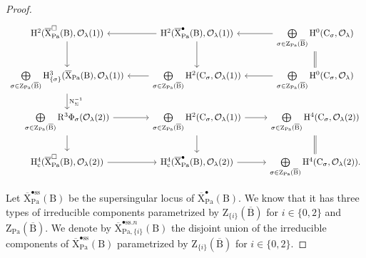 \documentclass[10pt,a4paper]{amsart}
\def\Pa{\mathrm{Pa}}
\def\calO{\mathcal{O}}
\def\rmB{\mathrm{B}}
\def\rmC{\mathrm{C}}
\def\rmH{\mathrm{H}}
\def\rmN{\mathrm{N}}
\def\rmR{\mathrm{R}}
\def\rmX{\mathrm{X}}
\def\rmZ{\mathrm{Z}}
\def\rmc{\mathrm{c}}
\begin{document}
\begin{proof}
\begin{equation*}
\begin{tikzcd}
\rmH^{2}(\overline{\rmX}^{\square}_{\Pa}(\rmB), \calO_{\lambda}(1)) \arrow[d] & \rmH^{2}(\overline{\rmX}^{\bullet}_{\Pa}(\rmB), \calO_{\lambda}(1)) \arrow[l] \arrow[d] & \bigoplus\limits_{\sigma\in \rmZ_{\Pa}(\overline{\rmB})}\rmH^{0}(\rmC_{\sigma}, \calO_{\lambda}) \arrow[l] \arrow[d, equal] \\
\bigoplus\limits_{\sigma\in \rmZ_{\Pa}(\overline{\rmB})}\rmH^{3}_{\{\sigma\}}(\overline{\rmX}_{\Pa}(\rmB), \calO_{\lambda}(1))  \arrow[d, "\rmN^{-1}_{\Sigma}"]           &  \bigoplus\limits_{\sigma\in \rmZ_{\Pa}(\overline{\rmB})}\rmH^{2}(\rmC_{\sigma}, \calO_{\lambda}(1))  \arrow[l]           &  \bigoplus\limits_{\sigma\in \rmZ_{\Pa}(\overline{\rmB})}\rmH^{0}(\rmC_{\sigma}, \calO_{\lambda}) \arrow[l]                                \\
\bigoplus\limits_{\sigma\in \rmZ_{\Pa}(\overline{\rmB})}\rmR^{3}\Phi_{\sigma}(\calO_{\lambda}(2))  \arrow[r] \arrow[d] & \bigoplus\limits_{\sigma\in \rmZ_{\Pa}(\overline{\rmB})}\rmH^{2}(\rmC_{\sigma}, \calO_{\lambda}(1))  \arrow[r] \arrow[d] & \bigoplus\limits_{\sigma\in \rmZ_{\Pa}(\overline{\rmB})}\rmH^{4}(\rmC_{\sigma}, \calO_{\lambda}(2))  \arrow[d, equal]           \\
\rmH^{4}_{\rmc}(\overline{\rmX}^{\square}_{\Pa}(\rmB), \calO_{\lambda}(2)) \arrow[r]           & \rmH^{4}_{\rmc}(\overline{\rmX}^{\bullet}_{\Pa}(\rmB), \calO_{\lambda}(2))\arrow[r]           &\bigoplus\limits_{\sigma\in \rmZ_{\Pa}(\overline{\rmB})}\rmH^{4}(\rmC_{\sigma}, \calO_{\lambda}(2)).                                   
\end{tikzcd}
\end{equation*}

Let $\overline{\rmX}^{\bullet\mathrm{ss}}_{\Pa}(\rmB)$ be the supersingular locus of $\overline{\rmX}^{\bullet}_{\Pa}(\rmB)$. We know that it has three types of irreducible components parametrized by $\rmZ_{\{i\}}(\overline{\rmB})$ for $i\in\{0,2\}$ and $\rmZ_{\Pa}(\overline{\rmB})$. We denote by $\overline{\rmX}^{\bullet\mathrm{ss}.n}_{\Pa, \{i\}}(\rmB)$ the disjoint union of the irreducible components of $\overline{\rmX}^{\bullet\mathrm{ss}}_{\Pa}(\rmB)$ parametrized by $\rmZ_{\{i\}}(\overline{\rmB})$ for $i\in\{0,2\}$. 


\end{proof}
\end{document}

